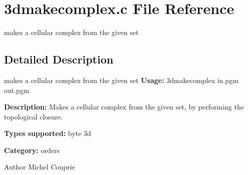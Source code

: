 \section{3dmakecomplex.c File Reference}
\label{3dmakecomplex_8c}


makes a cellular complex from the given set  




\subsection{Detailed Description}
makes a cellular complex from the given set {\bfseries Usage:} 3dmakecomplex in.pgm out.pgm

{\bfseries Description:} Makes a cellular complex from the given set, by performing the topological closure.

{\bfseries Types supported:} byte 3d

{\bfseries Category:} orders

\begin{DoxyAuthor}{Author}
Michel Couprie 
\end{DoxyAuthor}
